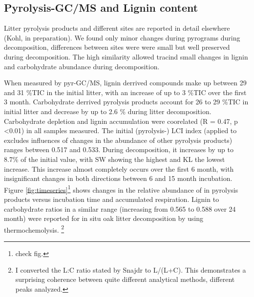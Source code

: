 \documentclass[authoryear,preprint,review,12pt]{elsarticle}
\begin{document}
\subsection{Pyrolysis-GC/MS and Lignin content}

Litter pyrolysis products and different sites are reported in detail elsewhere (Kohl, in preparation). We found only minor changes during pyrograms during decomposition, differences between sites were were small but well preserved during decomposition. The high similarity allowed tracind small changes in lignin and carbohydrate abundance during decomposition. %

When measured by pyr-GC/MS, lignin derrived compounds make up between 29 and 31 \%TIC in the initial litter, with an increase of up to 3 \%TIC over the first 3 month. Carbohydrate derrived pyrolysis products account for 26 to 29 \%TIC in initial litter and decrease by up to 2.6 \% during litter decomposition. Carbohydrate depletion and lignin accumulation were coorelated (R = 0.47, p \textless 0.01) in all samples measured. The initial (pyrolysis-) LCI index (applied to excludes influences of changes in the abundance of other pyrolysis products) ranges between 0.517 and 0.533. During decomposition, it increases by up to 8.7\% of the initial value, with SW showing the highest and KL the lowest increase. This increase almost completely occurs over the first 6 month, with insignificant changes in both directions between 6 and 15 month incubation. Figure \ref{fig:timeseries}\footnote{check fig.} shows changes in the relative abundance of in pyrolysis products versus incubation time and accumulated respiration. Lignin to carbohydrate ratios in a similar range (increasing from 0.565 to 0.588 over 24 month) were reported for in situ oak litter decomposition by \cite{Snajdr2011} using thermochemolysis. \footnote{I converted the L:C ratio stated by Snajdr to L/(L+C). This demonstrates a surprising coherence between quite different analytical methods, different peaks analyzed.}
\end{document}
